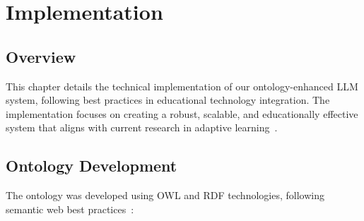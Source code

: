 \chapter{Implementation}
\label{chap:implementation}

\section{Overview}
This chapter details the technical implementation of our ontology-enhanced LLM system, following best practices in educational technology integration. The implementation focuses on creating a robust, scalable, and educationally effective system that aligns with current research in adaptive learning~\cite{wang2024adaptive}.

\section{Ontology Development}
\label{sec:ontology-dev}

The ontology was developed using OWL and RDF technologies, following semantic web best practices~\cite{liu2024ontology}:

